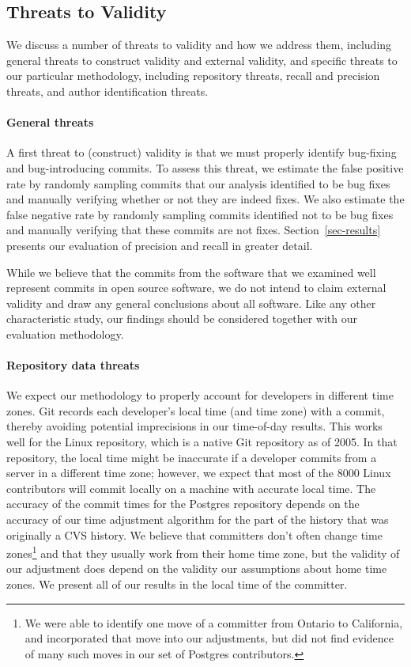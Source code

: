 \subsection{Threats to Validity}
We discuss a number of threats to validity and how we address them,
including general threats to construct validity and external validity,
and specific threats to our particular methodology, including 
repository threats, recall and precision threats, 
and author identification threats.

\paragraph{General threats}
A first threat to (construct) validity is that we must properly
identify bug-fixing and bug-introducing commits. To assess this
threat, we estimate the false positive rate by randomly sampling
commits that our analysis identified to be bug fixes and manually
verifying whether or not they are indeed fixes.  We also estimate the
false negative rate by randomly sampling commits identified not to be
bug fixes and manually verifying that these commits are not fixes.
Section~\ref{sec-results} presents our evaluation of precision and recall 
in greater detail.

While we believe that the commits from the software that we examined
well represent commits in open source software, we do not intend to
claim external validity and draw any general conclusions about all
software.  Like any other characteristic study, our findings should be
considered together with our evaluation methodology.

\paragraph{Repository data threats}
We expect our methodology to properly account for developers in
different time zones. Git records each developer's local time (and
time zone) with a commit, thereby avoiding potential imprecisions in
our time-of-day results. This works well for the Linux repository,
which is a native Git repository as of 2005. In that repository, the
local time might be inaccurate if a developer commits from a server in
a different time zone; however, we expect that most of the 8000 Linux
contributors will commit locally on a machine with accurate local
time.  The accuracy of the commit times for the Postgres repository
depends on the accuracy of our time adjustment algorithm for the part
of the history that was originally a CVS history. We believe that
committers don't often change time zones\footnote{We were able to identify
one move of a committer from Ontario to California, and incorporated that
move into our adjustments, but did not find evidence of many such moves
in our set of Postgres contributors.} and that they usually work from their
home time zone, but the validity of our adjustment does depend on the
validity our assumptions about home time zones. We present all of our
results in the local time of the committer.


